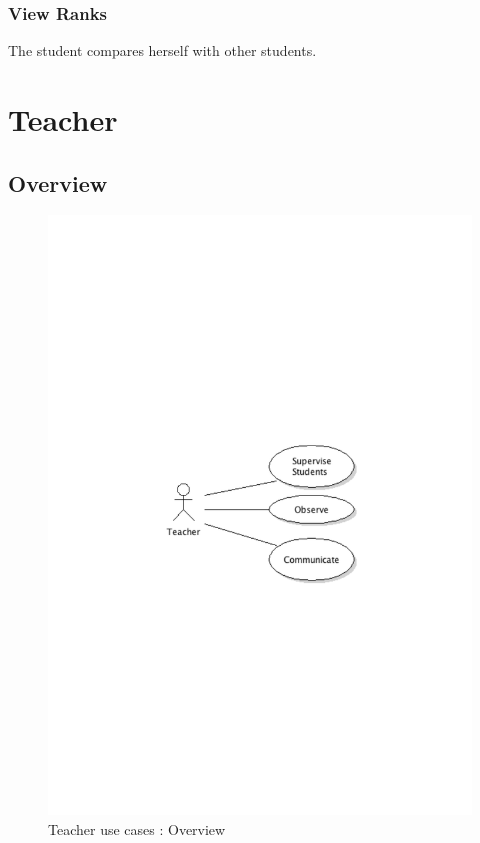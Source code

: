 		\subsubsection{View Ranks}
			The student compares herself with other students.
\newpage
\section{Teacher}
	\subsection{Overview}
		\begin{figure}[ht]
			\begin{center}
				\includegraphics[width=\textwidth,  trim=2cm 11cm 2cm 12cm]{UML_figure/use_cases/teacher/UC_Teacher_General.pdf}
				\caption{Teacher use cases : Overview}
			\end{center}
		\end{figure}
